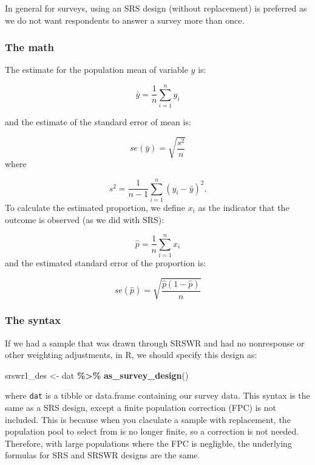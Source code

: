 \documentclass[
]{krantz}
\makeatletter
\newenvironment{Shaded}{\begin{snugshade}}{\end{snugshade}}
\newcommand{\FunctionTok}[1]{\textcolor[rgb]{0.27,0.27,0.27}{\textbf{#1}}}
\newcommand{\NormalTok}[1]{#1}
\newcommand{\OtherTok}[1]{\textcolor[rgb]{0.37,0.37,0.37}{#1}}
\newcommand{\SpecialCharTok}[1]{\textcolor[rgb]{0.43,0.43,0.43}{\textbf{#1}}}
\newenvironment{kframe}{%
\medskip{}
\setlength{\fboxsep}{.8em}
 \def\at@end@of@kframe{}%
 \ifinner\ifhmode%
  \def\at@end@of@kframe{\end{minipage}}%
  \begin{minipage}{\columnwidth}%
 \fi\fi%
 \def\FrameCommand##1{\hskip\@totalleftmargin \hskip-\fboxsep
 \colorbox{shadecolor}{##1}\hskip-\fboxsep
     \hskip-\linewidth \hskip-\@totalleftmargin \hskip\columnwidth}%
 \MakeFramed {\advance\hsize-\width
   \@totalleftmargin\z@ \linewidth\hsize
   \@setminipage}}%
 {\par\unskip\endMakeFramed%
 \at@end@of@kframe}
\renewenvironment{Shaded}{\begin{kframe}}{\end{kframe}}
\makeatother
\begin{document}
In general for surveys, using an SRS design (without replacement) is preferred as we do not want respondents to answer a survey more than once.

\hypertarget{the-math-1}{%
\subsubsection*{The math}\label{the-math-1}}


The estimate for the population mean of variable \(y\) is:

\[\bar{y}=\frac{1}{n}\sum_{i=1}^n y_i\]

and the estimate of the standard error of mean is:

\[se(\bar{y})=\sqrt{\frac{s^2}{n}}\] where

\[s^2=\frac{1}{n-1}\sum_{i=1}^n\left(y_i-\bar{y}\right)^2.\]
To calculate the estimated proportion, we define \(x_i\) as the indicator that the outcome is observed (as we did with SRS):

\[\hat{p}=\frac{1}{n}\sum_{i=1}^n x_i \]
and the estimated standard error of the proportion is:

\[se(\hat{p})=\sqrt{\frac{\hat{p}(1-\hat{p})}{n}} \]

\hypertarget{the-syntax-1}{%
\subsubsection*{The syntax}\label{the-syntax-1}}


If we had a sample that was drawn through SRSWR and had no nonresponse or other weighting adjustments, in R, we should specify this design as:

\begin{Shaded}
\begin{Highlighting}[]
\NormalTok{srswr1\_des }\OtherTok{\textless{}{-}}\NormalTok{ dat }\SpecialCharTok{\%\textgreater{}\%}
 \FunctionTok{as\_survey\_design}\NormalTok{()}
\end{Highlighting}
\end{Shaded}

where \texttt{dat} is a tibble or data.frame containing our survey data. This syntax is the same as a SRS design, except a finite population correction (FPC) is not included. This is because when you claculate a sample with replacement, the population pool to select from is no longer finite, so a correction is not needed. Therefore, with large populations where the FPC is negligble, the underlying formulas for SRS and SRSWR designs are the same.
\end{document}
